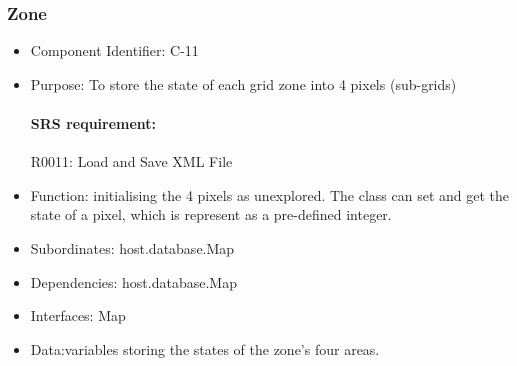 \documentclass[11pt, a4paper]{report}
\begin{document}
\subsubsection{Zone}
\begin{itemize}
\item Component Identifier: C-11
\item Purpose: To store the state of each grid zone into 4 pixels (sub-grids) 
\paragraph{SRS requirement:} R0011: Load and Save XML File
\item Function: initialising the 4 pixels as unexplored. The class can set and get the state
of a pixel, which is represent as a pre-defined integer. 
\item Subordinates: host.database.Map
\item Dependencies: host.database.Map
\item Interfaces: Map
\item Data:variables storing the states of the zone's four areas.
\end{itemize}

\end{document}
